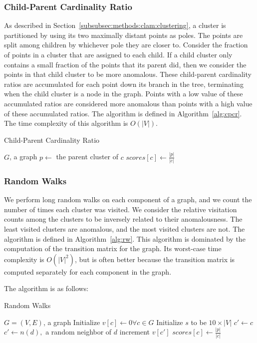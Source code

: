 \subsubsection{Child-Parent Cardinality Ratio}
As described in Section~\ref{subsubsec:methods:clam:clustering}, a cluster is partitioned by using its two maximally distant points as poles.
The points are split among children by whichever pole they are closer to.
Consider the fraction of points in a cluster that are assigned to each child.
If a child cluster only contains a small fraction of the points that its parent did, then we consider the points in that child cluster to be more anomalous.
These child-parent cardinality ratios are accumulated for each point down its branch in the tree, terminating when the child cluster is a node in the graph.
Points with a low value of these accumulated ratios are considered more anomalous than points with a high value of these accumulated ratios. The algorithm is defined in Algorithm~\ref{alg:cpcr}. The time complexity of this algorithm is $O(|V|)$.

\begin{algorithm}[h]
    \caption{Child-Parent Cardinality Ratio}
    \label{alg:cpcr}
\begin{algorithmic}[1]
    \REQUIRE $G$, a graph
        \STATE $p \gets$ the parent cluster of $c$
        \STATE $scores[c] \gets \frac{|p|}{|c|}$
    \ENDFOR
\end{algorithmic}
\end{algorithm}


\subsubsection{Random Walks}
We perform long random walks on each component of a graph, and we count the number of times each cluster was visited.
We consider the relative visitation counts among the clusters to be inversely related to their anomalousness.
The least visited clusters are anomalous, and the most visited clusters are not. The algorithm is defined in Algorithm~\ref{alg:rw}.
This algorithm is dominated by the computation of the transition matrix for the graph.
Its worst-case time complexity is $O(|V|^2)$, but is often better because the transition matrix is computed separately for each component in the graph.

The algorithm is as follows:

\begin{algorithm}[h]
    \caption{Random Walks}
    \label{alg:rw}
\begin{algorithmic}[1]
    \REQUIRE $G = (V,E)$, a graph
    \STATE Initialize $v[c] \gets 0 \forall c \in G$
    \STATE Initialize $s$ to be $10 \times |V|$
        \STATE $c' \gets c$
            \STATE $c' \gets n(d),$ a random neighbor of $d$
            \STATE increment $v[c']$
        \ENDFOR
    \ENDFOR
        \STATE $scores[c] \gets \frac{|p|}{|c|}$
    \ENDFOR
\end{algorithmic}
\end{algorithm}


